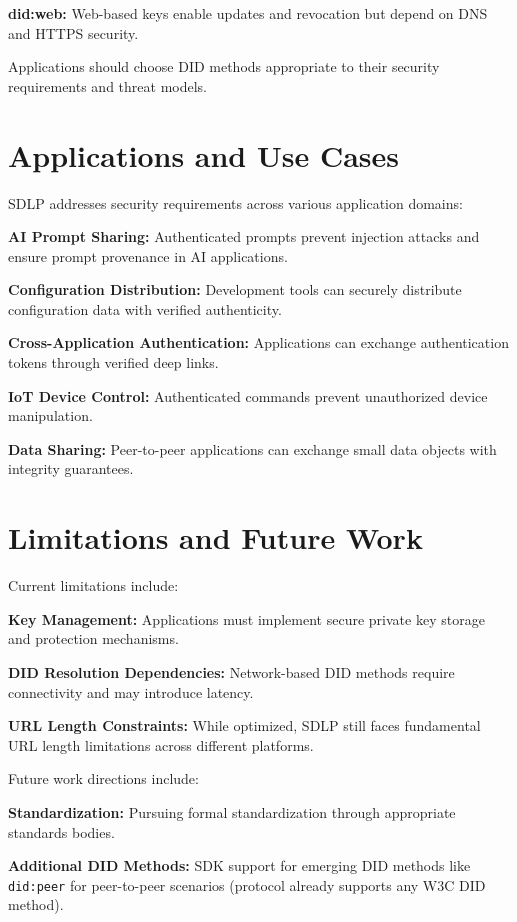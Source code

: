 \documentclass[conference]{IEEEtran}
\begin{document}
\textbf{did:web:} Web-based keys enable updates and revocation but depend on DNS and HTTPS security.

Applications should choose DID methods appropriate to their security requirements and threat models.

\section{Applications and Use Cases}

SDLP addresses security requirements across various application domains:

\textbf{AI Prompt Sharing:} Authenticated prompts prevent injection attacks and ensure prompt provenance in AI applications.

\textbf{Configuration Distribution:} Development tools can securely distribute configuration data with verified authenticity.

\textbf{Cross-Application Authentication:} Applications can exchange authentication tokens through verified deep links.

\textbf{IoT Device Control:} Authenticated commands prevent unauthorized device manipulation.

\textbf{Data Sharing:} Peer-to-peer applications can exchange small data objects with integrity guarantees.

\section{Limitations and Future Work}

Current limitations include:

\textbf{Key Management:} Applications must implement secure private key storage and protection mechanisms.

\textbf{DID Resolution Dependencies:} Network-based DID methods require connectivity and may introduce latency.

\textbf{URL Length Constraints:} While optimized, SDLP still faces fundamental URL length limitations across different platforms.

Future work directions include:

\textbf{Standardization:} Pursuing formal standardization through appropriate standards bodies.

\textbf{Additional DID Methods:} SDK support for emerging DID methods like \texttt{did:peer} for peer-to-peer scenarios (protocol already supports any W3C DID method).
\end{document}
